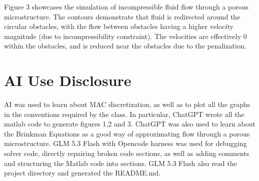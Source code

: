 \documentclass[11pt,letterpaper]{article}
\begin{document}
   Figure 3 showcases the simulation of incompressible fluid flow through a porous microstructure. The contours demonstrate that fluid is redirected around the circular obstacles, with the flow between obstacles having a higher velocity magnitude (due to incompressibility constraint). The velocities are effectively 0 within the obstacles, and is reduced near the obstacles due to the penalization.

\section{AI Use Disclosure}
AI was used to learn about MAC discretization, as well as to plot all the graphs in the conventions required by the class. In particular, ChatGPT wrote all the matlab code to generate figures 1,2 and 3. ChatGPT was also used to learn about the Brinkman Equations as a good way of approximating flow through a porous microstructure. GLM 5.3 Flash with Opencode harness was used for debugging solver code, directly repairing broken code sections, as well as adding comments and structuring the Matlab code into sections. GLM 5.3 Flash also read the project directory and generated the README.md.
\end{document}
